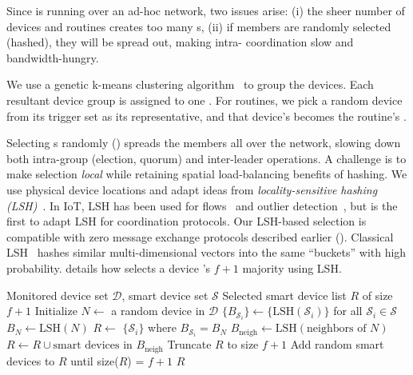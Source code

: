 Since \sysname{} is running over an ad-hoc network, two  issues arise: 
(i) the sheer number of devices and routines creates too many \kgroup{}s,  
(ii) if \kgroup{} members are randomly selected (hashed), they will be spread out, making intra-\kgroup{} coordination slow and bandwidth-hungry.

 We use a
genetic k-means clustering algorithm~\cite{KMeans} to group the devices. Each resultant device group is assigned to one \kgroup. For routines, we pick a random device from its trigger set as its representative, and that device's \kgroup{} becomes the routine's \kgroup. 

 Selecting \kgroup{}s randomly () spreads the \kgroup{} members all over the network, slowing down
{both intra-group (election, quorum) and inter-leader operations}.
A challenge is to make \kgroup{} selection {\it local} while retaining spatial load-balancing benefits of hashing. %
We use physical device locations and adapt ideas from {\it locality-sensitive hashing (LSH)}~\cite{datar_locality-sensitive_2004}. 
In IoT, LSH has been used for flows~\cite{iottraffic} and outlier detection~\cite{omnibus}, but \sysname{} is the first to adapt LSH for coordination protocols. Our LSH-based selection is compatible with zero message exchange protocols described earlier ().
Classical LSH~\cite{datar_locality-sensitive_2004} hashes similar multi-dimensional vectors into the same ``buckets'' with high probability. 
 details how \sysname{} selects a device \kgroup's $f{+}1$ majority using LSH.

\begin{algorithm}[t]
    \footnotesize
    \caption{\small \sysname{} LSH Majority Selection Rule}
    \label{comesh:alg:lsh_majority_selection}
    \begin{algorithmic}[1]
        \Require Monitored device set $\mathcal{D}$, smart device set $\mathcal{S}$
        \Ensure Selected smart device list $R$ of size $f + 1$
        \State Initialize $N \gets$ a random device in $\mathcal{D}$
        \State $\{B_{\mathcal{S}_i}\} \gets \{\text{LSH}(\mathcal{S}_i)\}$ for all $\mathcal{S}_i \in \mathcal{S}$ 
        \State $B_{N} \gets \text{LSH}(N)$
        \State $R \gets$ $\{\mathcal{S}_i\}$ where $B_{\mathcal{S}_i} = B_{N}$ 
            \State $B_{\text{neigh}} \gets \text{LSH}(\text{neighbors of } N)$
            \State $R \gets R  \cup \text{smart devices in }B_{\text{neigh}}$
        \EndIf
         Truncate $R$ to size $f + 1$
        \Else{} Add random smart devices to $R$ until size($R$) = $f + 1$
        \EndIf
        \State \Return $R$
    \end{algorithmic}
\end{algorithm}

